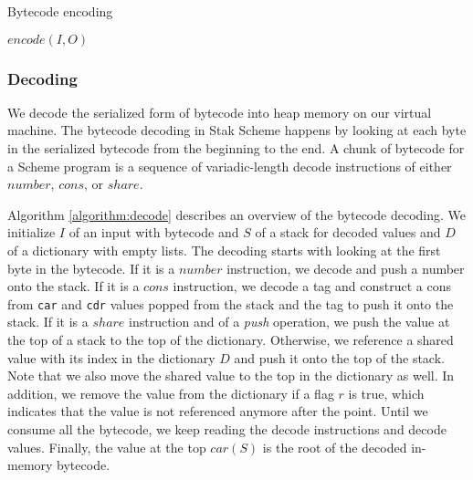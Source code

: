 \documentclass[sigplan, anonymous, review]{acmart}
\begin{document}
\begin{algorithm}
  \caption{Bytecode encoding}
  \label{algorithm:encode}



  $encode(I, O)$ \;
\end{algorithm}

\subsubsection{Decoding} \label{decoding}

We decode the serialized form of bytecode into heap memory on
our virtual machine.
The bytecode decoding in Stak Scheme happens by looking at each byte in
the serialized bytecode from the beginning to the end.
A chunk of bytecode for a Scheme program is a sequence of
variadic-length decode instructions of either $number$, $cons$, or $share$.

Algorithm \ref{algorithm:decode} describes an overview of the
bytecode decoding.
We initialize $I$ of an input with bytecode and $S$ of a stack for decoded
values and $D$ of a dictionary with empty lists.
The decoding starts with looking at the first byte in the bytecode.
If it is a $number$ instruction, we decode and push a number onto the stack.
If it is a $cons$ instruction, we decode a tag and construct a cons
from \texttt{car} and \texttt{cdr} values popped from the stack
and the tag to push it onto the stack.
If it is a $share$ instruction and of a \textit{push} operation, we push the
value at the top of a stack to the top of the dictionary.
Otherwise, we reference a shared value with its index in the
dictionary $D$ and push it onto the top of the stack.
Note that we also move the shared value to the top in the dictionary as well.
In addition, we remove the value from the dictionary if a flag $r$ is
true, which indicates that the value is not referenced anymore after the point.
Until we consume all the bytecode, we keep reading the decode instructions and
decode values.
Finally, the value at the top $car(S)$ is the root of the decoded
in-memory bytecode.
\end{document}
